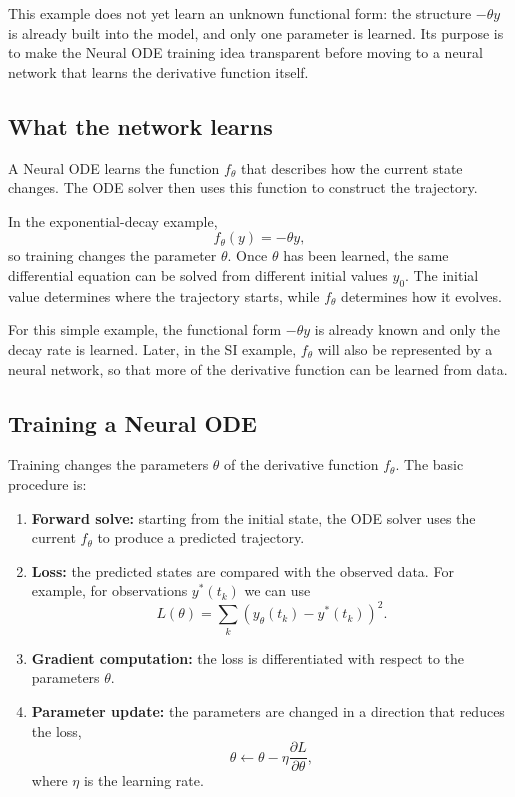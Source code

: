 \documentclass[11pt,a4paper]{article}
\begin{document}
This example does not yet learn an unknown functional form: the structure
$-\theta y$ is already built into the model, and only one parameter is
learned. Its purpose is to make the Neural ODE training idea transparent
before moving to a neural network that learns the derivative function itself.

\subsection{What the network learns}

A Neural ODE learns the function $f_\theta$ that describes how the current
state changes. The ODE solver then uses this function to construct the
trajectory.

In the exponential-decay example,
\[
    f_\theta(y)=-\theta y,
\]
so training changes the parameter $\theta$. Once $\theta$ has been learned,
the same differential equation can be solved from different initial values
$y_0$. The initial value determines where the trajectory starts, while
$f_\theta$ determines how it evolves.

For this simple example, the functional form $-\theta y$ is already known and
only the decay rate is learned. Later, in the SI example, $f_\theta$ will also
be represented by a neural network, so that more of the derivative function
can be learned from data.

\subsection{Training a Neural ODE}

Training changes the parameters $\theta$ of the derivative function
$f_\theta$. The basic procedure is:

\begin{enumerate}
    \item[(1)] \textbf{Forward solve:}
    starting from the initial state, the ODE solver uses the current
    $f_\theta$ to produce a predicted trajectory.

    \item[(2)] \textbf{Loss:}
    the predicted states are compared with the observed data. For example,
    for observations $y^*(t_k)$ we can use
    \[
        L(\theta)
        =
        \sum_k
        \left(
            y_\theta(t_k)-y^*(t_k)
        \right)^2 .
    \]

    \item[(3)] \textbf{Gradient computation:}
    the loss is differentiated with respect to the parameters $\theta$.

    \item[(4)] \textbf{Parameter update:}
    the parameters are changed in a direction that reduces the loss,
    \[
        \theta
        \leftarrow
        \theta-\eta\frac{\partial L}{\partial\theta},
    \]
    where $\eta$ is the learning rate.
\end{enumerate}
\end{document}
